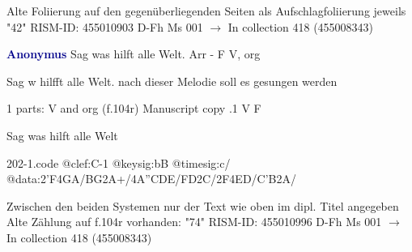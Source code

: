 \documentclass[twocolumn]{book}
\begin{document}
\newline Alte Foliierung auf den gegenüberliegenden Seiten als Aufschlagfoliierung jeweils "42"
\newline RISM-ID: 455010903
\newline D-Fh  Ms 001
\newline $\rightarrow$ In collection 418 (455008343)
      
\newline \par \vspace{7pt} \textcolor{darkblue}{\textbf{Anonymus  }}
\newline Sag was hilft alle Welt. Arr - F
\newline V, org
\newline \begin{itshape} Sag w hilfft alle Welt. nach dieser Melodie soll es gesungen werden\end{itshape} 
\newline \textcolor{darkblue}{}  1 parts: V and org  (f.104r)
\newline Manuscript copy
.1  V  F
\newline \begin{footnotesize} Sag was hilft alle Welt \end{footnotesize}  
\begin{filecontents*}{202-1.code}
@clef:C-1
@keysig:bB
@timesig:c/
@data:2'F4GA/BG2A+/4A''CDE/FD2C/2F4ED/C'B2A/
\end{filecontents*}
\newline
%

\newline Zwischen den beiden Systemen nur der Text wie oben im dipl. Titel angegeben
\newline Alte Zählung auf f.104r vorhanden: "74"
\newline RISM-ID: 455010996
\newline D-Fh  Ms 001
\newline $\rightarrow$ In collection 418 (455008343)
      
\end{document}
